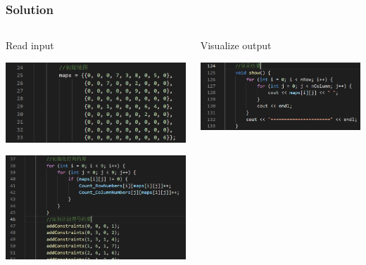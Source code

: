 \documentclass{beamer}
\begin{document}
\begin{frame}
  \frametitle{Solution}
  \begin{columns}
    \begin{column}{.5\linewidth}
      Read input
      
      \includegraphics[width=1.05\textwidth]{Pic/ini}

      
      \includegraphics[width=1.05\textwidth]{Pic/addC}
    \end{column}
    \begin{column}{.5\linewidth}
      Visualize output
      
      \includegraphics[width=1.05\textwidth]{Pic/print}
    \end{column}
  \end{columns}

\end{frame}
\end{document}
